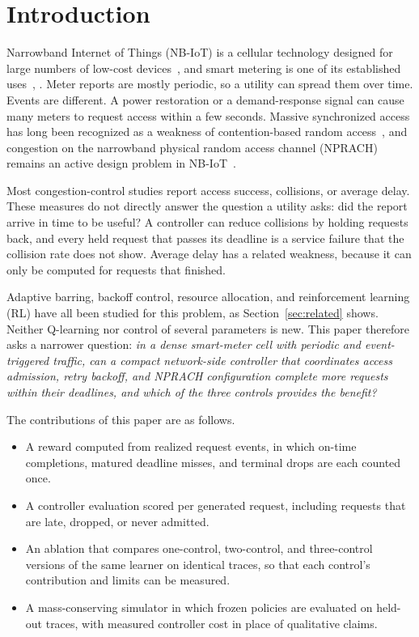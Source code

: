 \documentclass[conference]{IEEEtran}
\begin{document}
\section{Introduction}
Narrowband Internet of Things (NB-IoT) is a cellular technology designed for
large numbers of low-cost devices~\cite{wang}, and smart metering is one of its
established uses~\cite{stusek}, \cite{abbas}. Meter reports are mostly periodic,
so a utility can spread them over time. Events are different. A power restoration
or a demand-response signal can cause many meters to request access within a few
seconds. Massive synchronized access has long been recognized as a weakness of
contention-based random access~\cite{laya}, and congestion on the narrowband physical
random access channel (NPRACH) remains an active design problem in
NB-IoT~\cite{iiyambo}.

Most congestion-control studies report access success, collisions, or average
delay. These measures do not directly answer the question a utility asks: did the
report arrive in time to be useful? A controller can reduce collisions by holding
requests back, and every held request that passes its deadline is a service
failure that the collision rate does not show. Average delay has a related
weakness, because it can only be computed for requests that finished.

Adaptive barring, backoff control, resource allocation, and reinforcement learning
(RL) have all been studied for this problem, as Section~\ref{sec:related} shows.
Neither Q-learning nor control of several parameters is new. This paper therefore
asks a narrower question: \emph{in a dense smart-meter cell with periodic and
event-triggered traffic, can a compact network-side controller that coordinates
access admission, retry backoff, and NPRACH configuration complete more requests
within their deadlines, and which of the three controls provides the benefit?}

The contributions of this paper are as follows.
\begin{itemize}
\item A reward computed from realized request events, in which on-time
completions, matured deadline misses, and terminal drops are each counted once.
\item A controller evaluation scored per generated request, including requests
that are late, dropped, or never admitted.
\item An ablation that compares one-control, two-control, and three-control
versions of the same learner on identical traces, so that each control's
contribution and limits can be measured.
\item A mass-conserving simulator in which frozen policies are evaluated on
held-out traces, with measured controller cost in place of qualitative claims.
\end{itemize}
\end{document}
